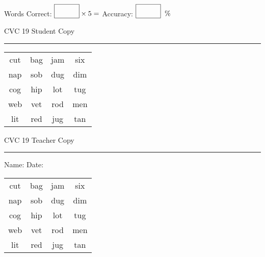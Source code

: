 \documentclass{memoir}
\begin{document}
\normalsize

Words Correct: $\fbox{\phantom{\huge 100}} \times 5 = $ Accuracy: $\fbox{\phantom{\huge 100}}\;\; \%$ 

\vfill

\newpage


\footnotesize \noindent
CVC 19 \hfill Student Copy
\smallskip
\hrule

\huge

\setlength{\tabcolsep}{14pt}
\def\arraystretch{2}

{\selectfont


\begin{vplace}[0.5]
\begin{center}
\begin{tabular}{cccc}
cut & bag & jam & six \\
nap & sob & dug & dim \\
cog & hip & lot & tug \\
web & vet & rod & men \\
lit & red & jug & tan \\
\end{tabular}
\end{center}
\end{vplace}

}

\newpage

\footnotesize \noindent
CVC 19 \hfill Teacher Copy
\smallskip
\hrule

\normalsize

\vfill

\noindent
Name: \underline{\hspace{1.75in}} \hfill Date: \underline{\hspace{1in}}

\huge

{\selectfont


\begin{vplace}[0.5]
\begin{center}
\begin{tabular}{cccc}
cut & bag & jam & six \\
nap & sob & dug & dim \\
cog & hip & lot & tug \\
web & vet & rod & men \\
lit & red & jug & tan \\
\end{tabular}
\end{center}
\end{vplace}



}
\end{document}
